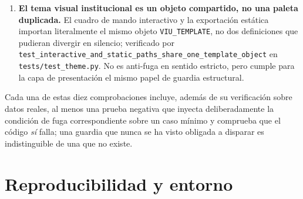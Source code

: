 \begin{sloppypar}
\begin{enumerate}
    \texttt{evaluate\_criterion\_a}, de forma que el veredicto ``NO CUMPLIDO'' no pueda
    derivar a posteriori hacia una lectura más favorable; verificado en
    \texttt{tests/\allowbreak{}test\_sensitivity\_analysis.py}.
  \item \textbf{El tema visual institucional es un objeto compartido, no una paleta
    duplicada.} El cuadro de mando interactivo y la exportación estática importan
    literalmente el mismo objeto \texttt{VIU\_TEMPLATE}, no dos definiciones que
    pudieran divergir en silencio; verificado por
    \texttt{test\_interactive\_\allowbreak{}and\_\allowbreak{}static\_\allowbreak{}paths\_\allowbreak{}share\_\allowbreak{}one\_\allowbreak{}template\_\allowbreak{}object}
    en \texttt{tests/\allowbreak{}test\_theme.py}. No es anti-fuga en sentido estricto,
    pero cumple para la capa de presentación el mismo papel de guardia estructural.
\end{enumerate}

Cada una de estas diez comprobaciones incluye, además de su verificación sobre datos
reales, al menos una prueba negativa que inyecta deliberadamente la condición de fuga
correspondiente sobre un caso mínimo y comprueba que el código \emph{sí} falla; una
guardia que nunca se ha visto obligada a disparar es indistinguible de una que no
existe.
\end{sloppypar}

\chapter{Reproducibilidad y entorno}\label{cap:anexo3}

